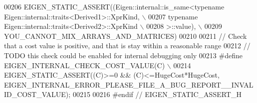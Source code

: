 \begin{DoxyCode}
00206 \textcolor{preprocessor}{      EIGEN\_STATIC\_ASSERT((Eigen::internal::is\_same<typename Eigen::internal::traits<Derived1>::XprKind, \(\backslash\)}
00207 \textcolor{preprocessor}{                                             typename Eigen::internal::traits<Derived2>::XprKind \(\backslash\)}
00208 \textcolor{preprocessor}{                                            >::value), \(\backslash\)}
00209 \textcolor{preprocessor}{                          YOU\_CANNOT\_MIX\_ARRAYS\_AND\_MATRICES)}
00210 
00211 \textcolor{comment}{// Check that a cost value is positive, and that is stay within a reasonable range}
00212 \textcolor{comment}{// TODO this check could be enabled for internal debugging only}
00213 \textcolor{preprocessor}{#define EIGEN\_INTERNAL\_CHECK\_COST\_VALUE(C) \(\backslash\)}
00214 \textcolor{preprocessor}{      EIGEN\_STATIC\_ASSERT((C)>=0 && (C)<=HugeCost*HugeCost,
       EIGEN\_INTERNAL\_ERROR\_PLEASE\_FILE\_A\_BUG\_REPORT\_\_INVALID\_COST\_VALUE);}
00215 
00216 \textcolor{preprocessor}{#endif // EIGEN\_STATIC\_ASSERT\_H}
\end{DoxyCode}
